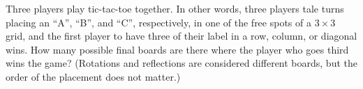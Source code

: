 Three players play tic-tac-toe together. In other words, three players tale turns placing an ``A'', ``B'', and ``C'', respectively, in one of the free spots of a $3 \times 3$ grid, and the first player to have three of their label in a row, column, or diagonal wins. How many possible final boards are there where the player who goes third wins the game? (Rotations and reflections are considered different boards, but the order of the placement does not matter.)
